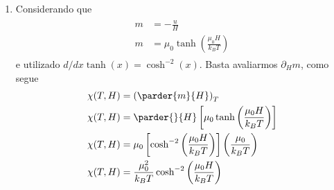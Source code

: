 \begin{prob}
\begin{sol}
\begin{enumerate}[label=\alph *)]
\begin{proof}[Demostração 7(b)]
\begin{align}
\begin{split}
						u&=-\alpha\tanh(\alpha\beta)\\
						u&=-\mu_0H\tanh\left(\frac{\mu_0H}{k_BT}\right)
					\end{split}
				\end{align}
			\end{proof}
			\item Considerando que
			\begin{align}
				\begin{split}
					m&=-\frac{u}{H}\\
					m&=\mu_0\tanh\left(\frac{\mu_0H}{k_BT}\right)
				\end{split}
			\end{align}
			e utilizado $d/dx\tanh(x)=\cosh^{-2}(x)$. Basta avaliarmos $\partial_Hm$, como segue
			\begin{align}
				\begin{split}					
				\chi(T,H)&=\left(\parder{m}{H}\right)_T\\
				\chi(T,H)&=\parder{}{H}\left[\mu_0\tanh\left(\frac{\mu_0H}{k_BT}\right)\right]\\
				\chi(T,H)&=\mu_0\left[\cosh^{-2}\left(\frac{\mu_0H}{k_BT}\right)\right]\left(\frac{\mu_0}{k_BT}\right)\\
				\chi(T,H)&=\frac{\mu_0^2}{k_BT}\cosh^{-2}\left(\frac{\mu_0H}{k_BT}\right)
				\end{split}
			\end{align}
		\end{enumerate}
	\end{sol}
\end{prob}

